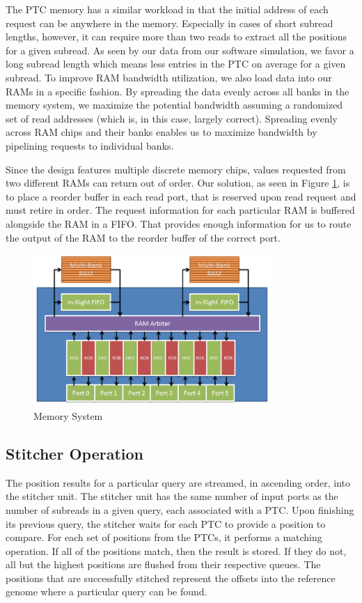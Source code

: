 \documentclass[11pt]{article}
\begin{document}
The PTC memory has a similar workload in that the initial address of each request can be anywhere in the memory.  Especially in cases of short subread lengths, however, it can require more than two reads to extract all the positions for a given subread.  As seen by our data from our software simulation, we favor a long subread length which means less entries in the PTC on average for a given subread.  To improve RAM bandwidth utilization, we also load data into our RAMs in a specific fashion.  By spreading the data evenly across all banks in the memory system, we maximize the potential bandwidth assuming a randomized set of read addresses (which is, in this case, largely correct).  Spreading evenly across RAM chips and their banks enables us to maximize bandwidth by pipelining requests to individual banks.

Since the design features multiple discrete memory chips, values requested from two different RAMs can return out of order.  Our solution, as seen in Figure \ref{rammodel}, is to place a reorder buffer in each read port, that is reserved upon read request and must retire in order.  The request information for each particular RAM is buffered alongside the RAM in a FIFO.  That provides enough information for us to route the output of the RAM to the reorder buffer of the correct port.  
\begin{figure}[ht!]
\centering
\includegraphics[width=90mm]{rammodel.png}
\caption{Memory System}
\label{rammodel}
\end{figure}

\subsection{Stitcher Operation}
The position results for a particular query are streamed, in ascending order, into the stitcher unit.  The stitcher unit has the same number of input ports as the number of subreads in a given query, each associated with a PTC.  Upon finishing its previous query, the stitcher waits for each PTC to provide a position to compare.  For each set of positions from the PTCs, it performs a matching operation.  If all of the positions match, then the result is stored.  If they do not, all but the highest positions are flushed from their respective queues.  The positions that are successfully stitched represent the offsets into the reference genome where a particular query can be found.
\end{document}
